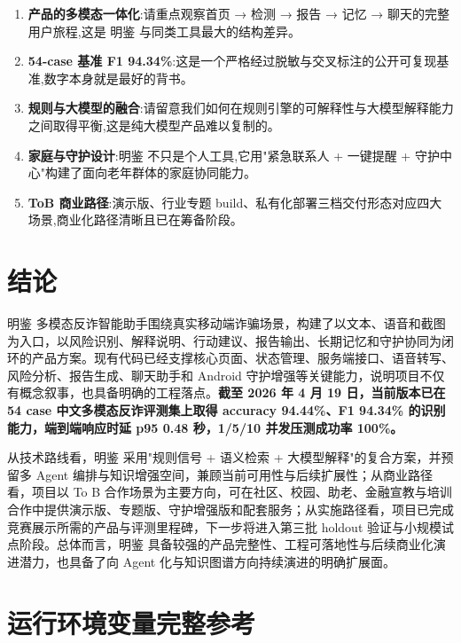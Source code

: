 \documentclass[UTF8,a4paper,12pt]{ctexart}
\begin{document}
\begin{enumerate}[leftmargin=2em,itemsep=0.3em]
    \item \textbf{产品的多模态一体化}:请重点观察首页 → 检测 → 报告 → 记忆 → 聊天的完整用户旅程,这是 明鉴 与同类工具最大的结构差异。
    \item \textbf{54-case 基准 F1 94.34\%}:这是一个严格经过脱敏与交叉标注的公开可复现基准,数字本身就是最好的背书。
    \item \textbf{规则与大模型的融合}:请留意我们如何在规则引擎的可解释性与大模型解释能力之间取得平衡,这是纯大模型产品难以复制的。
    \item \textbf{家庭与守护设计}:明鉴 不只是个人工具,它用"紧急联系人 + 一键提醒 + 守护中心"构建了面向老年群体的家庭协同能力。
    \item \textbf{ToB 商业路径}:演示版、行业专题 build、私有化部署三档交付形态对应四大场景,商业化路径清晰且已在筹备阶段。
\end{enumerate}

\section*{结论}

明鉴 多模态反诈智能助手围绕真实移动端诈骗场景，构建了以文本、语音和截图为入口，以风险识别、解释说明、行动建议、报告输出、长期记忆和守护协同为闭环的产品方案。现有代码已经支撑核心页面、状态管理、服务端接口、语音转写、风险分析、报告生成、聊天助手和 Android 守护增强等关键能力，说明项目不仅有概念叙事，也具备明确的工程落点。\textbf{截至 2026 年 4 月 19 日，当前版本已在 54 case 中文多模态反诈评测集上取得 accuracy 94.44\%、F1 94.34\% 的识别能力，端到端响应时延 p95 0.48 秒，1/5/10 并发压测成功率 100\%。}

从技术路线看，明鉴 采用"规则信号 + 语义检索 + 大模型解释"的复合方案，并预留多 Agent 编排与知识增强空间，兼顾当前可用性与后续扩展性；从商业路径看，项目以 To B 合作场景为主要方向，可在社区、校园、助老、金融宣教与培训合作中提供演示版、专题版、守护增强版和配套服务；从实施路径看，项目已完成竞赛展示所需的产品与评测里程碑，下一步将进入第三批 holdout 验证与小规模试点阶段。总体而言，明鉴 具备较强的产品完整性、工程可落地性与后续商业化演进潜力，也具备了向 Agent 化与知识图谱方向持续演进的明确扩展面。

\appendix
\renewcommand{\thesection}{附录\Alph{section}}
\setcounter{section}{0}

\section{运行环境变量完整参考}
\end{document}
